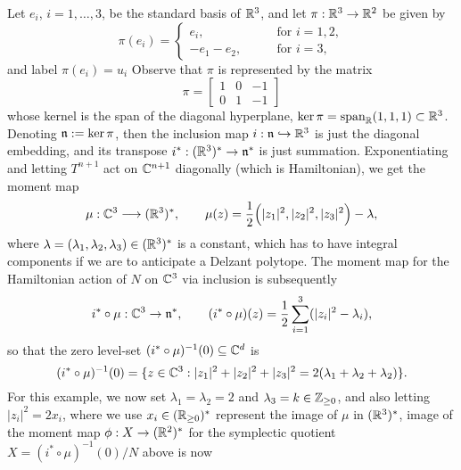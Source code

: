\begin{ex}
	Let $e_{i}$, $i = 1,\ldots,3$, be the standard basis of $\mathbb{R}^{3}$, and let $\pi: \mathbb{R}^{3} \rightarrow \mathbb{R}^{2}$ be given by
	\begin{equation*}
	\pi(e_{i}) =
	\begin{cases}
	e_{i},\qquad &\text{for } i=1,2,\\
	-e_{1}-e_{2},\qquad &\text{for } i=3,
	\end{cases}
	\end{equation*}
	and label $\pi(e_{i}) = u_{i}$ Observe that $\pi$ is represented by the matrix
	\begin{equation*}
	\pi = \begin{bmatrix}
	1 & 0 & -1 \\
	0 & 1 & -1
	\end{bmatrix}
	\end{equation*}
	whose kernel is the span of the diagonal hyperplane, $\ker \pi = \operatorname{span}_{\mathbb{R}}(1, 1, 1) \subset \mathbb{R}^{3}$. Denoting $\mathfrak{n} := \ker\pi$, then the inclusion map $i :\mathfrak{n} \hookrightarrow \mathbb{R}^{3}$ is just the diagonal embedding, and its transpose $i^{\ast}:(\mathbb{R}^{3})^{\ast} \rightarrow \mathfrak{n}^{\ast}$ is just summation. Exponentiating and letting $T^{n+1}$ act on $\mathbb{C}^{n+1}$ diagonally (which is Hamiltonian), we get the moment map
	\begin{equation*}
	\mu:\mathbb{C}^{3} \longrightarrow (\mathbb{R}^{3})^{\ast},\qquad \mu(z) = \frac{1}{2}\Big(|z_{1}|^{2}, |z_{2}|^{2}, |z_{3}|^{2}   \Big) - \lambda,
	\end{equation*}
	where $\lambda = (\lambda_{1}, \lambda_{2}, \lambda_{3}) \in (\mathbb{R}^{3})^{\ast}$ is a constant, which has to have integral components if we are to anticipate a Delzant polytope. The moment map for the Hamiltonian action of $N$ on $\mathbb{C}^{3}$ via inclusion is subsequently
	\begin{equation*}
	i^{\ast} \circ \mu:\mathbb{C}^{3} \rightarrow \mathfrak{n}^{\ast},\qquad (i^{\ast} \circ \mu)(z) = \frac{1}{2}\sum_{i=1}^{3}(|z_{i}|^{2} - \lambda_{i}),
	\end{equation*}
	so that the zero level-set $(i^{\ast} \circ \mu)^{-1}(0) \subseteq \mathbb{C}^{d}$ is
	\begin{equation*}
	(i^{\ast} \circ \mu)^{-1}(0) = \{z \in \mathbb{C}^{3} : |z_{1}|^{2} + |z_{2}|^{2} + |z_{3}|^{2} = 2(\lambda_{1} + \lambda_{2} + \lambda_{2}) \}.
	\end{equation*}
	For this example, we now set $\lambda_{1} = \lambda_{2} = 2$ and $\lambda_{3} = k\in \mathbb{Z}_{\geq 0}$, and also letting $|z_{i}|^{2} = 2x_{i}$, where we use $x_{i} \in (\mathbb{R}_{\geq 0})^{\ast}$ represent the image of $\mu$ in $(\mathbb{R}^{3})^{\ast}$, image of the moment map $\phi:X \rightarrow (\mathbb{R}^{2})^{\ast}$ for the symplectic quotient $X = (i^{\ast} \circ \mu)^{-1}(0)/N$ above is now

\end{ex}

